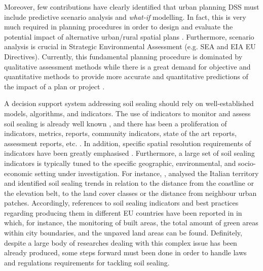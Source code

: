 \documentclass[APA,LATO1COL,doublespace]{WileyNJD-v2}
\begin{document}
Moreover, few contributions have clearly identified that urban planning DSS must include predictive scenario analysis \citep{Choi16,Xiang03,Volk10} and \textit{what-if} modelling. In fact, this is very much required in planning procedures in order to design and evaluate the potential impact of alternative urban/rural spatial plans \citep{Hawkins02,Harms95,Choi16,vonHaaren06}. 
Furthermore, scenario analysis is crucial in Strategic Environmental Assessment (e.g. SEA and EIA EU Directives). Currently, this fundamental planning procedure is dominated by qualitative assessment methods while there is a great demand for objective and quantitative methods \citep{Choi16} to provide more accurate and quantitative predictions of the impact of a plan or project \citep{Carver03,Vanderhaegen05}.

A decision support system addressing soil sealing should rely on well-established models, algorithms, and indicators. The use of indicators to monitor and assess soil sealing is already well known \citep{King16}, and there has been a proliferation of indicators, metrics, reports, community indicators, state of the art reports, assessment reports, etc. \citep{Maclaren96,Tanguay10}.
In addition, specific spatial resolution requirements of indicators have been greatly emphasised \citep{Jaeger08}.
Furthermore, a large set of soil sealing indicators is typically tuned to the specific geographic, environmental, and socio-economic setting under investigation.
For instance, \citet{Munafo13}, analysed the Italian territory and identified soil sealing trends in relation to the distance from the coastline or the elevation belt, to the land cover classes or the distance from neighbour urban patches.
Accordingly, references to soil sealing indicators and best practices regarding producing them in different EU countries have been reported in \citep{EC2011b} in which, for instance, the monitoring of built areas, the total amount of green areas within city boundaries, and the unpaved land areas can be found.
Definitely, despite a large body of researches dealing with this complex issue has been already produced, some steps forward must been done in order to handle laws and regulations requirements for tackling soil sealing.
\end{document}
